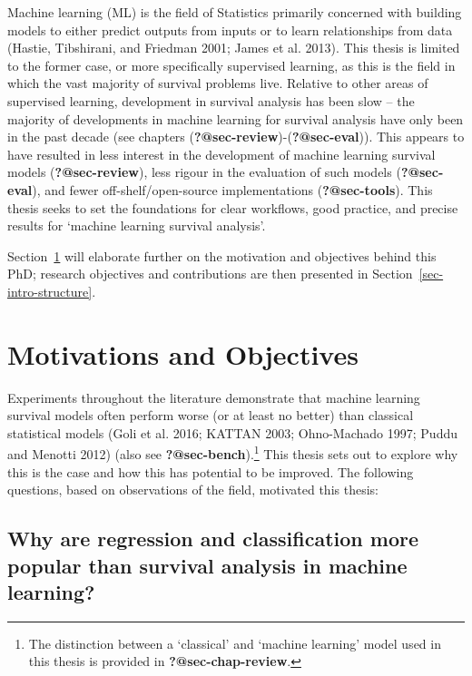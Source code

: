 \documentclass[
  letterpaper,
]{scrbook}
\theoremstyle{plain}
\theoremstyle{definition}
\theoremstyle{remark}
\begin{document}
Machine learning (ML) is the field of Statistics primarily concerned
with building models to either predict outputs from inputs or to learn
relationships from data (Hastie, Tibshirani, and Friedman 2001; James et
al. 2013). This thesis is limited to the former case, or more
specifically supervised learning, as this is the field in which the vast
majority of survival problems live. Relative to other areas of
supervised learning, development in survival analysis has been slow --
the majority of developments in machine learning for survival analysis
have only been in the past decade (see chapters
(\textbf{?@sec-review})-(\textbf{?@sec-eval})). This appears to have
resulted in less interest in the development of machine learning
survival models (\textbf{?@sec-review}), less rigour in the evaluation
of such models (\textbf{?@sec-eval}), and fewer off-shelf/open-source
implementations (\textbf{?@sec-tools}). This thesis seeks to set the
foundations for clear workflows, good practice, and precise results for
`machine learning survival analysis'.

Section~\ref{sec-intro-motobj} will elaborate further on the motivation
and objectives behind this PhD; research objectives and contributions
are then presented in Section~\ref{sec-intro-structure}.

\hypertarget{sec-intro-motobj}{%
\section{Motivations and Objectives}\label{sec-intro-motobj}}

Experiments throughout the literature demonstrate that machine learning
survival models often perform worse (or at least no better) than
classical statistical models (Goli et al. 2016; KATTAN 2003;
Ohno-Machado 1997; Puddu and Menotti 2012) (also see
\textbf{?@sec-bench}).\footnote{The distinction between a `classical'
  and `machine learning' model used in this thesis is provided in
  \textbf{?@sec-chap-review}.} This thesis sets out to explore why this
is the case and how this has potential to be improved. The following
questions, based on observations of the field, motivated this thesis:

\hypertarget{why-are-regression-and-classification-more-popular-than-survival-analysis-in-machine-learning}{%
\subsection{Why are regression and classification more popular than
survival analysis in machine
learning?}\label{why-are-regression-and-classification-more-popular-than-survival-analysis-in-machine-learning}}
\end{document}
